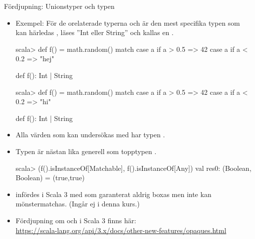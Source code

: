 \begin{Slide}{Fördjupning: Unionstyper och typen }
\begin{itemize}\SlideFontSmall
\item Exempel: För de orelaterade typerna  och  är den mest specifika typen som kan härledas , läses ''Int eller String'' och kallas en  .

\ifswedish
\begin{REPLsmall}
scala> def f() = math.random() match
          case a if a > 0.5 => 42
          case a if a < 0.2 => "hej"

def f(): Int | String
\end{REPLsmall}
\else
\begin{REPLsmall}
scala> def f() = math.random() match
          case a if a > 0.5 => 42
          case a if a < 0.2 => "hi"

def f(): Int | String
\end{REPLsmall}
\fi{}

\item Alla värden som kan undersökas med  har typen  .
\item Typen  är nästan lika generell som topptypen . 
\begin{REPLsmall}
scala> (f().isInstanceOf[Matchable], f().isInstanceOf[Any])
val res0:  (Boolean, Boolean) = (true,true)
\end{REPLsmall}


\item {} infördes i Scala 3 med  som garanterat aldrig boxas men inte kan mönstermatchas. (Ingår ej i denna kurs.)
\item Fördjupning om  och  i Scala 3 finns här:
\\\url{https://scala-lang.org/api/3.x/docs/other-new-features/opaques.html}
\end{itemize}
\end{Slide}

